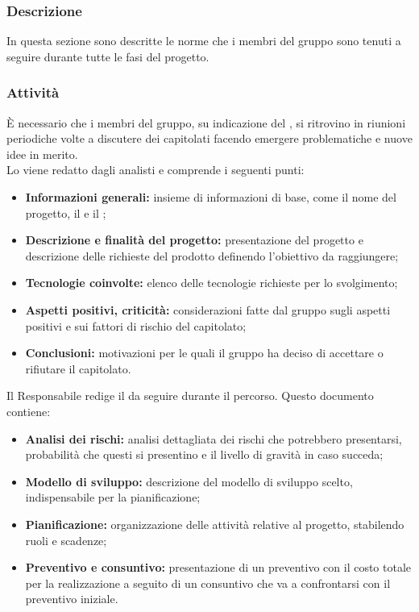 \subsubsection{Descrizione}
In questa sezione sono descritte le norme che i membri del gruppo \Omicron{} sono tenuti a seguire durante tutte le fasi del progetto.
\subsubsection{Attività}
\myparagraph{\SdF}
È necessario che i membri del gruppo, su indicazione del \respProg, si ritrovino in riunioni periodiche volte a discutere dei capitolati facendo emergere problematiche e nuove idee in merito.\\
Lo \SdFv{}viene redatto dagli analisti e comprende i seguenti punti:
\begin{itemize}
    \item \textbf{Informazioni generali:} insieme di informazioni di base, come il nome del progetto, il \proponProg{} e il \commitProg{};
    \item \textbf{Descrizione e finalità del progetto:} presentazione del progetto e descrizione delle richieste del prodotto definendo l'obiettivo da raggiungere;
    \item \textbf{Tecnologie coinvolte:} elenco delle tecnologie richieste per lo svolgimento;
    \item \textbf{Aspetti positivi, criticità:} considerazioni fatte dal gruppo sugli aspetti positivi e sui fattori di rischio del capitolato;
    \item \textbf{Conclusioni:} motivazioni per le quali il gruppo ha deciso di accettare o rifiutare il capitolato.
\end{itemize}
\myparagraph{\PdP} 
Il Responsabile redige il \PdPv{}da seguire durante il percorso. Questo documento contiene:
\begin{itemize}
    \item \textbf{Analisi dei rischi:} analisi dettagliata dei rischi che potrebbero presentarsi, probabilità che questi si presentino e il livello di gravità in caso succeda;
    \item \textbf{Modello di sviluppo:} descrizione del modello di sviluppo scelto, indispensabile per la pianificazione;
    \item \textbf{Pianificazione:} organizzazione delle attività relative al progetto, stabilendo ruoli e scadenze;
    \item \textbf{Preventivo e consuntivo:} presentazione di un preventivo con il costo totale per la realizzazione a seguito di un consuntivo che va a confrontarsi con il preventivo iniziale.
\end{itemize}

